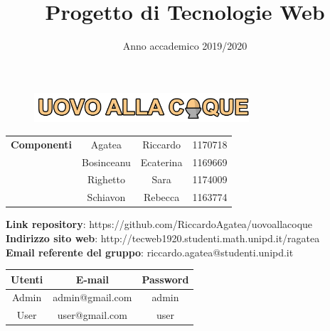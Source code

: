 
\title{Progetto di Tecnologie Web}
\author{}
\date{Anno accademico 2019/2020}


	\maketitle
	\begin{figure}[H]
		\centering
		\includegraphics[width=8cm]{img/logo.png}
	\end{figure}
	\begin{table}[H]
		\centering
		\begin{tabular}{c|c c c}
			\textbf{Componenti}&Agatea&Riccardo&1170718\\
			&Bosinceanu&Ecaterina&1169669\\
			&Righetto&Sara&1174009\\
			&Schiavon&Rebecca&1163774\\
		\end{tabular}
	\end{table}

	\begin{center}
		\textbf{Link repository}: https://github.com/RiccardoAgatea/uovoallacoque\\
		\textbf{Indirizzo sito web}: http://tecweb1920.studenti.math.unipd.it/ragatea\\
		\textbf{Email referente del gruppo}: riccardo.agatea@studenti.unipd.it
	\end{center}

	\begin{table}[H]
		\centering
		\begin{tabular}{c|c c}
			\textbf{Utenti} & \textbf{E-mail} & \textbf{Password} \\
			\hline
			Admin & admin@gmail.com & admin \\
			User & user@gmail.com & user \\
		\end{tabular}
	\end{table}
	\newpage
	\tableofcontents
	\newpage
	\renewcommand{\abstractname}{Abstract}
	\begin{abstract}
		
	\end{abstract}
	\newpage
	
	\newpage
	
	\newpage
	
	\newpage
	
	\newpage
	
